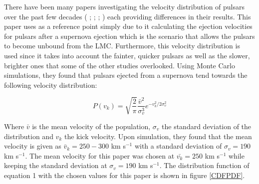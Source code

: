 There have been many papers investigating the velocity distribution of pulsars over the past few decades (\cite{Lorimer} ; \cite{Hansen1997} ; \cite{Toscano1999} ; \cite{Hobbs2005}) each providing differences in their results. This paper uses \cite{Hansen1997} as a reference point simply due to it calculating the ejection velocities for pulsars after a supernova ejection which is the scenario that allows the pulsars to become unbound from the LMC. Furthermore, this velocity distribution is used since it takes into account the fainter, quicker pulsars as well as the slower, brighter ones that some of the other studies overlooked. Using Monte Carlo simulations, they found that pulsars ejected from a supernova tend towards the following velocity distribution:

\begin{equation}
    P(v_k) = \sqrt{\frac{2}{\pi}}\frac{\bar{v}^2}{\sigma^3_v}e^{-v_k^2/2\sigma_v^2}
\end{equation}

Where $\bar{v}$ is the mean velocity of the population, $\sigma_v$ the standard deviation of the distribution and $v_k$ the kick velocity. Upon simulation, they found that the mean velocity is given as $\bar{v}_k = 250-300$ km s$^{-1}$ with a standard deviation of $\sigma_v = 190$ km s$^{-1}$. The mean velocity for this paper was chosen at $\bar{v_k} = 250$ km s$^{-1}$ while keeping the standard deviation at $\sigma_v = 190$ km s$^{-1}$. The distribution function of equation 1 with the chosen values for this paper is shown in figure \ref{CDFPDF}.

